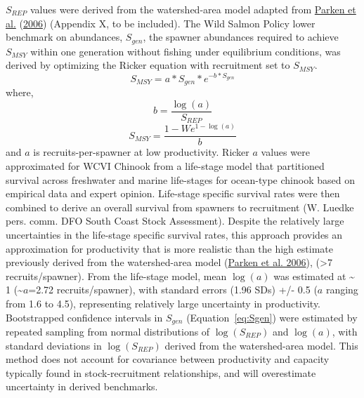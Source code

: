 \documentclass[11pt]{book}
\begin{document}
\(S_{REP}\) values were derived from the watershed-area model adapted from \protect\hyperlink{ref-parkenHabitatbasedMethodsEstimate2006}{Parken et al.} (\protect\hyperlink{ref-parkenHabitatbasedMethodsEstimate2006}{2006}) (Appendix X, to be included). The Wild Salmon Policy lower benchmark on abundances, \(S_{gen}\), the spawner abundances required to achieve \(S_{MSY}\) within one generation without fishing under equilibrium conditions, was derived by optimizing the Ricker equation with recruitment set to \(S_{MSY}\).
\begin{equation}
  S_{MSY} = a * S_{gen}* e^{-b * S_{gen}}
   \label{eq:Sgen}
\end{equation}
where,
\begin{equation}
  b = \frac{\log(a)}{S_{REP}}
   \label{eq:ricB}
\end{equation}
\begin{equation}
  S_{MSY} = \frac{1 - W{e^{1-\log(a)}} } {b}
   \label{eq:SMSY}
\end{equation}
and \(a\) is recruits-per-spawner at low productivity. Ricker \(a\) values were approximated for WCVI Chinook from a life-stage model that partitioned survival across freshwater and marine life-stages for ocean-type chinook based on empirical data and expert opinion. Life-stage specific survival rates were then combined to derive an overall survival from spawners to recruitment (W. Luedke pers. comm. DFO South Coast Stock Assessment). Despite the relatively large uncertainties in the life-stage specific survival rates, this approach provides an approximation for productivity that is more realistic than the high estimate previously derived from the watershed-area model (\protect\hyperlink{ref-parkenHabitatbasedMethodsEstimate2006}{Parken et al. 2006}), (\textgreater7 recruits/spawner). From the life-stage model, mean \(\log(a)\) was estimated at \textasciitilde{} 1 (\textasciitilde{}\(a\)=2.72 recruits/spawner), with standard errors (1.96 SDs) +/- 0.5 (\(a\) ranging from 1.6 to 4.5), representing relatively large uncertainty in productivity. Bootstrapped confidence intervals in \(S_{gen}\) (Equation~\ref{eq:Sgen}) were estimated by repeated sampling from normal distributions of \(\log(S_{REP})\) and \(\log(a)\), with standard deviations in \(\log(S_{REP})\) derived from the watershed-area model. This method does not account for covariance between productivity and capacity typically found in stock-recruitment relationships, and will overestimate uncertainty in derived benchmarks.
\end{document}
